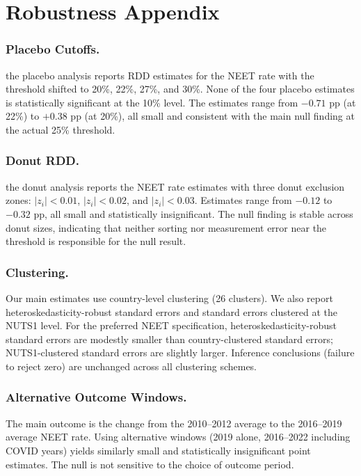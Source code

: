 \documentclass[12pt]{article}
\begin{document}
\section{Robustness Appendix}
\label{sec:appC}

\subsubsection*{Placebo Cutoffs.} the placebo analysis reports RDD estimates for the NEET rate with the threshold shifted to 20\%, 22\%, 27\%, and 30\%. None of the four placebo estimates is statistically significant at the 10\% level. The estimates range from $-0.71$ pp (at 22\%) to $+0.38$ pp (at 20\%), all small and consistent with the main null finding at the actual 25\% threshold.


\subsubsection*{Donut RDD.} the donut analysis reports the NEET rate estimates with three donut exclusion zones: $|z_i| < 0.01$, $|z_i| < 0.02$, and $|z_i| < 0.03$. Estimates range from $-0.12$ to $-0.32$ pp, all small and statistically insignificant. The null finding is stable across donut sizes, indicating that neither sorting nor measurement error near the threshold is responsible for the null result.


\subsubsection*{Clustering.} Our main estimates use country-level clustering (26 clusters). We also report heteroskedasticity-robust standard errors and standard errors clustered at the NUTS1 level. For the preferred NEET specification, heteroskedasticity-robust standard errors are modestly smaller than country-clustered standard errors; NUTS1-clustered standard errors are slightly larger. Inference conclusions (failure to reject zero) are unchanged across all clustering schemes.

\subsubsection*{Alternative Outcome Windows.} The main outcome is the change from the 2010--2012 average to the 2016--2019 average NEET rate. Using alternative windows (2019 alone, 2016--2022 including COVID years) yields similarly small and statistically insignificant point estimates. The null is not sensitive to the choice of outcome period.
\end{document}
